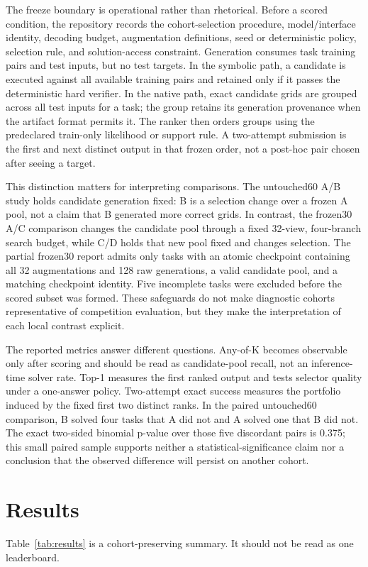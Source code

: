 \documentclass[10pt]{article}
\begin{document}
The freeze boundary is operational rather than rhetorical. Before a scored condition, the repository records the cohort-selection procedure, model/interface identity, decoding budget, augmentation definitions, seed or deterministic policy, selection rule, and solution-access constraint. Generation consumes task training pairs and test inputs, but no test targets. In the symbolic path, a candidate is executed against all available training pairs and retained only if it passes the deterministic hard verifier. In the native path, exact candidate grids are grouped across all test inputs for a task; the group retains its generation provenance when the artifact format permits it. The ranker then orders groups using the predeclared train-only likelihood or support rule. A two-attempt submission is the first and next distinct output in that frozen order, not a post-hoc pair chosen after seeing a target.

This distinction matters for interpreting comparisons. The untouched60 A/B study holds candidate generation fixed: B is a selection change over a frozen A pool, not a claim that B generated more correct grids. In contrast, the frozen30 A/C comparison changes the candidate pool through a fixed 32-view, four-branch search budget, while C/D holds that new pool fixed and changes selection. The partial frozen30 report admits only tasks with an atomic checkpoint containing all 32 augmentations and 128 raw generations, a valid candidate pool, and a matching checkpoint identity. Five incomplete tasks were excluded before the scored subset was formed. These safeguards do not make diagnostic cohorts representative of competition evaluation, but they make the interpretation of each local contrast explicit.

The reported metrics answer different questions. Any-of-K becomes observable only after scoring and should be read as candidate-pool recall, not an inference-time solver rate. Top-1 measures the first ranked output and tests selector quality under a one-answer policy. Two-attempt exact success measures the portfolio induced by the fixed first two distinct ranks. In the paired untouched60 comparison, B solved four tasks that A did not and A solved one that B did not. The exact two-sided binomial p-value over those five discordant pairs is 0.375; this small paired sample supports neither a statistical-significance claim nor a conclusion that the observed difference will persist on another cohort.

\section{Results}
Table~\ref{tab:results} is a cohort-preserving summary. It should not be read as one leaderboard.
\end{document}
